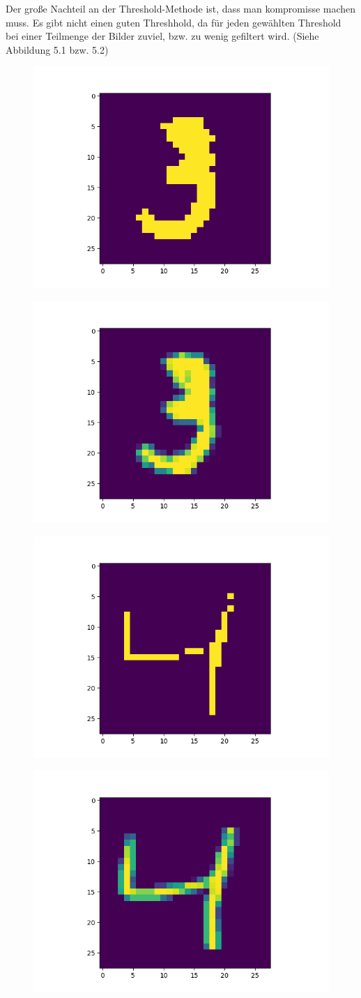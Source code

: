 Der große Nachteil an der Threshold-Methode ist, dass man kompromisse machen muss. Es gibt nicht einen guten Threshhold, da für jeden gewählten Threshold bei einer Teilmenge der Bilder zuviel, bzw. zu wenig gefiltert wird. (Siehe Abbildung 5.1 bzw. 5.2)
\begin{figure}[h]
\centering
\begin{minipage}{.5\textwidth}
  \centering
  \includegraphics[width=.4\linewidth]{./bilder/comparison/threshold/100_3}
  \label{fig:bin3}
\end{minipage}%
\begin{minipage}{.5\textwidth}
  \centering
  \includegraphics[width=.4\linewidth]{./bilder/comparison/default_3}
  \label{fig:dflt}
\end{minipage}
\begin{minipage}{.5\textwidth}
  \centering
  \includegraphics[width=.4\linewidth]{./bilder/comparison/threshold/200}
  \label{fig:bin4}
\end{minipage}%
\begin{minipage}{.5\textwidth}
  \centering
  \includegraphics[width=.4\linewidth]{./bilder/comparison/default}
  \label{fig:dflt}
\end{minipage}

\end{figure}
